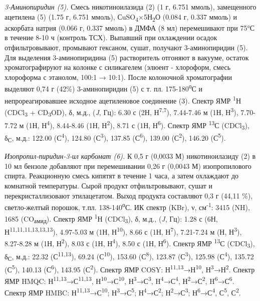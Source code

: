 \begin{multicols}{2}
\emph{3-Аминопиридин (5).} Смесь никотиноилазида (2) (1 г, 6.751 ммоль),
замещенного ацетилена (5) (1.75 г, 6.751 ммоль),
СuSO\textsubscript{4}×5Н\textsubscript{2}О (0.084 г, 0.337 ммоль) и
аскорбата натрия (0.066 г, 0.337 ммоль) в ДМФА (8 мл) перемешивают при
75°С в течение 8-10 ч (контроль ТСХ). Выпавший при охлаждении осадок
отфильтровывают, промывают гексаном, сушат, получают 3-аминопиридин (5).
Для выделения 3-аминопиридина (5) растворитель отгоняют в вакууме,
остаток хроматографируют на колонке с силикагелем (элюент - хлороформ,
смесь хлороформа с этанолом, 100:1 → 10:1). После колоночной
хроматографии выделяют 0,74 г (42\%) 3-аминопиридин (5) с т. пл.
175-180\textsuperscript{о}С и непрореагировавшее исходное ацетиленовое
соединение (3). Спектр ЯМР \textsuperscript{1}Н (CDCl\textsubscript{3} +
CD\textsubscript{3}OD), δ, м.д., (\emph{J}, Гц): 6.30 с (2Н,
Н\textsuperscript{7,7}), 7.44-7.46 м (1Н, Н\textsuperscript{3}),
7.70-7.72 м (1Н, Н\textsuperscript{4}), 8.44-8.46 (1Н,
Н\textsuperscript{2}), 8.71 с (1Н, Н\textsuperscript{6}). Спектр ЯМР
\textsuperscript{13}С (CDCl\textsubscript{3}), δ\textsubscript{С}, м.д.:
122.00 (С\textsuperscript{4}), 124.80 (С\textsuperscript{3}), 137.85
(С\textsuperscript{6}), 139.00 (С\textsuperscript{2}), 146.20
(С\textsuperscript{5}).

\emph{Изопропил-пиридин-3-ил карбомат (6).} К 0,5 г (0,0033 М)
никотиноилазиду (2) в 10 мл бензоле добавляют при перемешивании 0,26 г
(0,0043 М) изопропилового спирта. Реакционную смесь кипятят в течение 1
часа, а затем охлаждают до комнатной температуры. Сырой продукт
отфильтровывают, сушат и перекристаллизовают этилацетатом. Выход
продукта составляют 0,3 г (44,11 \%), светло-желтый порошок, т.пл.
138-140\textsuperscript{о}С. ИК спектр (KBr), ν, см\textsuperscript{-1}:
3415 (NH), 1685 (CO\textsubscript{амид}). Спектр ЯМР
\textsuperscript{1}Н (CDCl\textsubscript{3}), δ, м.д., (\emph{J}, Гц):
1.28 с (6Н, Н\textsuperscript{11,11,11,13,13,13}), 4.97-5.03 м (1Н,
Н\textsuperscript{10}), 8.66 с (1Н, Н\textsuperscript{7}), 7.21-7.24 м
(Н, Н\textsuperscript{3}), 8.27-8.28 м (1Н, Н\textsuperscript{2}), 8.03
с (1Н, Н\textsuperscript{4}), 8.50 с (1Н, Н\textsuperscript{6}). Спектр
ЯМР \textsuperscript{13}С (CDCl\textsubscript{3}), δ\textsubscript{С},
м.д.: 22.32 (С\textsuperscript{11,13}), 69.24 (С\textsuperscript{10}),
153.60 (С\textsuperscript{8}), 123.87 (С\textsuperscript{3}), 125.98
(С\textsuperscript{4}), 135.72 (С\textsuperscript{5}), 140.13
(С\textsuperscript{6}), 143.95 (С\textsuperscript{2}). Спектр ЯМР COSY:
Н\textsuperscript{11,13}→Н\textsuperscript{10},
Н\textsuperscript{3}→Н\textsuperscript{2}. Спектр ЯМР HMQC:
Н\textsuperscript{11,13}→С\textsuperscript{11,13},
Н\textsuperscript{10}→С\textsuperscript{10},
Н\textsuperscript{3}→С\textsuperscript{3},
H\textsuperscript{4}→С\textsuperscript{4},
Н\textsuperscript{2}→С\textsuperscript{2},
H\textsuperscript{6}→С\textsuperscript{6}. Спектр ЯМР HMBC:
Н\textsuperscript{11,13}→С\textsuperscript{10};
Н\textsuperscript{3}→С\textsuperscript{5};
Н\textsuperscript{4}→С\textsuperscript{2};
Н\textsuperscript{2}→С\textsuperscript{3};
Н\textsuperscript{6}→С\textsuperscript{4}, С\textsuperscript{5},
С\textsuperscript{2}.


\end{multicols}
